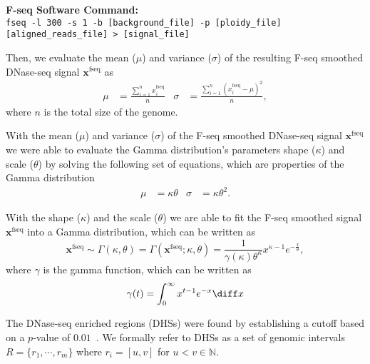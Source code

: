\vspace{0.3cm}
\noindent
\textbf{F-seq Software Command:}\\
\texttt{fseq -l 300 -s 1 -b [background\_file] -p [ploidy\_file] [aligned\_reads\_file] > [signal\_file]}
\vspace{0.3cm}

Then, we evaluate the mean ($\mu$) and variance ($\sigma$) of the resulting F-seq smoothed DNase-seq signal $\mathbf{x}^{\text{fseq}}$ as
\begin{align}
  \label{eq:fseq.mean.std}
  \mu &= \frac{\sum_{i=1}^{n} x^{\text{fseq}}_{i}}{n} &
  \sigma &= \frac{ \sum_{i=1}^{n} \left( x^{\text{fseq}}_{i} - \mu \right)^2}{n},
\end{align}
where $n$ is the total size of the genome.

With the mean ($\mu$) and variance ($\sigma$) of the F-seq smoothed DNase-seq signal $\mathbf{x}^{\text{fseq}}$ we were able to evaluate the Gamma distribution's parameters shape ($\kappa$) and scale ($\theta$) by solving the following set of equations, which are properties of the Gamma distribution
\begin{align}
  \label{eq:fseq.shape.scale}
  \mu &= \kappa \theta &
  \sigma &= \kappa {\theta}^{2}.
\end{align}

With the shape ($\kappa$) and the scale ($\theta$) we are able to fit the F-seq smoothed signal $\mathbf{x}^{\text{fseq}}$ into a Gamma distribution, which can be written as
\begin{equation}
  \label{eq:gamma.distribution}
  \mathbf{x}^{\text{fseq}} \sim \Gamma(\kappa,\theta) = \Gamma(\mathbf{x}^{\text{fseq}}; \kappa,\theta) = 
  \frac{1}{\gamma(\kappa) {\theta}^{\kappa}} {x}^{\kappa-1} {e}^{-\frac{x}{\theta}},
\end{equation}
where $\gamma$ is the gamma function, which can be written as
\begin{equation}
  \label{eq:gamma.function}
  \gamma(t) = \int_{0}^{\infty} {x}^{t-1} {e}^{-x} \diff x
\end{equation}

The DNase-seq enriched regions (DHSs) were found by establishing a cutoff based on a $p$-value of $0.01$~\cite{boyle2008b,encode2012}. We formally refer to DHSs as a set of genomic intervals $R = \{ {r}_{1}, \cdots, {r}_{m} \}$ where ${r}_{i} = [u,v]$ for $u<v \in \mathbb{N}$.

